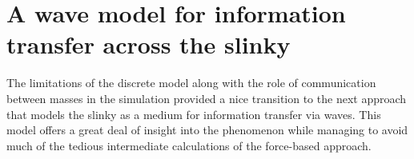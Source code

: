 \documentclass[pre,preprint,superscriptaddress,longbibliography]{revtex4-1}
\begin{document}

\section{A wave model for information transfer across the slinky}
\label{sec:wave}

The limitations of the discrete model along with the role of communication between masses in the simulation provided a nice transition to the next approach that models the slinky as a medium for information transfer via waves.  This model offers a great deal of insight into the phenomenon while
managing to avoid much of the tedious intermediate calculations of the force-based approach. 
\end{document}
